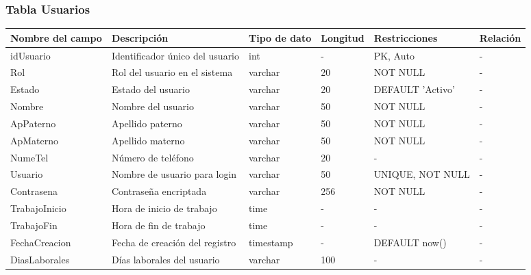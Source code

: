 
\newcommand{\crearTablaDiccionario}[1]{%
  \subsubsection{#1}
  \begin{longtable}{|p{4cm}|p{2cm}|p{2cm}|p{1.5cm}|p{2.2cm}|p{2.8cm}|}
    \hline
    \textbf{Nombre del campo} & \textbf{Descripción} & \textbf{Tipo de dato} & \textbf{Longitud} & \textbf{Restricciones} & \textbf{Relación} \\ \hline
}

\crearTablaDiccionario{Tabla Usuarios}
    idUsuario & Identificador único del usuario & int & - & PK, Auto & - \\ \hline
    Rol & Rol del usuario en el sistema & varchar & 20 & NOT NULL & - \\ \hline
    Estado & Estado del usuario & varchar & 20 & DEFAULT 'Activo' & - \\ \hline
    Nombre & Nombre del usuario & varchar & 50 & NOT NULL & - \\ \hline
    ApPaterno & Apellido paterno & varchar & 50 & NOT NULL & - \\ \hline
    ApMaterno & Apellido materno & varchar & 50 & NOT NULL & - \\ \hline
    NumeTel & Número de teléfono & varchar & 20 & - & - \\ \hline
    Usuario & Nombre de usuario para login & varchar & 50 & UNIQUE, NOT NULL & - \\ \hline
    Contrasena & Contraseña encriptada & varchar & 256 & NOT NULL & - \\ \hline
    TrabajoInicio & Hora de inicio de trabajo & time & - & - & - \\ \hline
    TrabajoFin & Hora de fin de trabajo & time & - & - & - \\ \hline
    FechaCreacion & Fecha de creación del registro & timestamp & - & DEFAULT now() & - \\ \hline
    DiasLaborales & Días laborales del usuario & varchar & 100 & - & - \\ \hline
\end{longtable}

